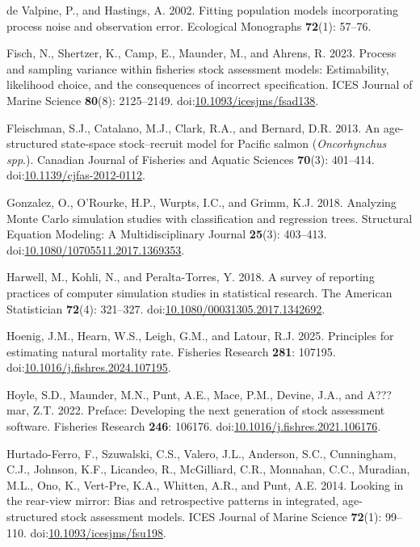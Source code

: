 \documentclass[
  12pt,
]{article}
\newlength{\cslhangindent}
\newenvironment{CSLReferences}[2] %
 {\begin{list}{}{%
  \setlength{\itemindent}{0pt}
  \setlength{\leftmargin}{0pt}
  \setlength{\parsep}{0pt}
  \ifodd #1
   \setlength{\leftmargin}{\cslhangindent}
   \setlength{\itemindent}{-1\cslhangindent}
  \fi
  \setlength{\itemsep}{#2\baselineskip}}}
 {\end{list}}
\begin{document}
\begin{CSLReferences}{1}{0}
de Valpine, P., and Hastings, A. 2002. Fitting population models
incorporating process noise and observation error. Ecological Monographs
\textbf{72}(1): 57--76.

Fisch, N., Shertzer, K., Camp, E., Maunder, M., and Ahrens, R. 2023.
Process and sampling variance within fisheries stock assessment models:
Estimability, likelihood choice, and the consequences of incorrect
specification. ICES Journal of Marine Science \textbf{80}(8):
2125--2149.
doi:\href{https://doi.org/10.1093/icesjms/fsad138}{10.1093/icesjms/fsad138}.

Fleischman, S.J., Catalano, M.J., Clark, R.A., and Bernard, D.R. 2013.
An age-structured state-space stock--recruit model for {P}acific salmon
(\emph{{O}ncorhynchus spp}.). Canadian Journal of Fisheries and Aquatic
Sciences \textbf{70}(3): 401--414.
doi:\href{https://doi.org/10.1139/cjfas-2012-0112}{10.1139/cjfas-2012-0112}.

Gonzalez, O., O'Rourke, H.P., Wurpts, I.C., and Grimm, K.J. 2018.
Analyzing {M}onte {C}arlo simulation studies with classification and
regression trees. Structural Equation Modeling: A Multidisciplinary
Journal \textbf{25}(3): 403--413.
doi:\href{https://doi.org/10.1080/10705511.2017.1369353}{10.1080/10705511.2017.1369353}.

Harwell, M., Kohli, N., and Peralta-Torres, Y. 2018. A survey of
reporting practices of computer simulation studies in statistical
research. The American Statistician \textbf{72}(4): 321--327.
doi:\href{https://doi.org/10.1080/00031305.2017.1342692}{10.1080/00031305.2017.1342692}.

Hoenig, J.M., Hearn, W.S., Leigh, G.M., and Latour, R.J. 2025.
Principles for estimating natural mortality rate. Fisheries Research
\textbf{281}: 107195.
doi:\href{https://doi.org/10.1016/j.fishres.2024.107195}{10.1016/j.fishres.2024.107195}.

Hoyle, S.D., Maunder, M.N., Punt, A.E., Mace, P.M., Devine, J.A., and
A???mar, Z.T. 2022. Preface: Developing the next generation of stock
assessment software. Fisheries Research \textbf{246}: 106176.
doi:\href{https://doi.org/10.1016/j.fishres.2021.106176}{10.1016/j.fishres.2021.106176}.

Hurtado-Ferro, F., Szuwalski, C.S., Valero, J.L., Anderson, S.C.,
Cunningham, C.J., Johnson, K.F., Licandeo, R., McGilliard, C.R.,
Monnahan, C.C., Muradian, M.L., Ono, K., Vert-Pre, K.A., Whitten, A.R.,
and Punt, A.E. 2014. Looking in the rear-view mirror: Bias and
retrospective patterns in integrated, age-structured stock assessment
models. ICES Journal of Marine Science \textbf{72}(1): 99--110.
doi:\href{https://doi.org/10.1093/icesjms/fsu198}{10.1093/icesjms/fsu198}.


\end{CSLReferences}
\end{document}
